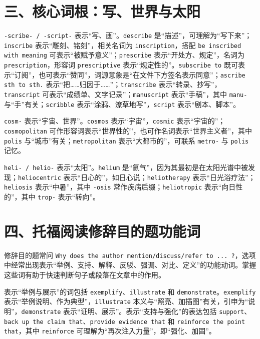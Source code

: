 \documentclass[UTF8,zihao=-4]{ctexart}
\begin{document}
\section*{三、核心词根：写、世界与太阳}

\texttt{-scribe- / -script-} 表示“写、画”。\texttt{describe} 是“描述”，可理解为“写下来”；\texttt{inscribe} 表示“雕刻、铭刻”，相关名词为 \texttt{inscription}，搭配 \texttt{be inscribed with meaning} 可表示“被赋予意义”；\texttt{prescribe} 表示“开处方、规定”，名词为 \texttt{prescription}，形容词 \texttt{prescriptive} 表示“规定性的”。\texttt{subscribe to} 既可表示“订阅”，也可表示“赞同”，词源意象是“在文件下方签名表示同意”；\texttt{ascribe sth to sth.} 表示“把……归因于……”；\texttt{transcribe} 表示“转录、抄写”，\texttt{transcript} 可表示“成绩单、文字记录”；\texttt{manuscript} 表示“手稿”，其中 \texttt{manu-} 与“手”有关；\texttt{scribble} 表示“涂鸦、潦草地写”，\texttt{script} 表示“剧本、脚本”。

\texttt{cosm-} 表示“宇宙、世界”。\texttt{cosmos} 表示“宇宙”，\texttt{cosmic} 表示“宇宙的”；\texttt{cosmopolitan} 可作形容词表示“世界性的”，也可作名词表示“世界主义者”，其中 \texttt{polis} 与“城市”有关；\texttt{metropolitan} 表示“大都市的”，可联系 \texttt{metro-} 与 \texttt{polis} 记忆。

\texttt{heli- / helio-} 表示“太阳”。\texttt{helium} 是“氦气”，因为其最初是在太阳光谱中被发现；\texttt{heliocentric} 表示“日心的”，如日心说；\texttt{heliotherapy} 表示“日光浴疗法”；\texttt{heliosis} 表示“中暑”，其中 \texttt{-osis} 常作疾病后缀；\texttt{heliotropic} 表示“向日性的”，其中 \texttt{trop-} 表示“转向”。

\section*{四、托福阅读修辞目的题功能词}

修辞目的题常问 \texttt{Why does the author mention/discuss/refer to ... ?}，选项中经常出现表示“举例、支持、解释、反驳、强调、对比、定义”的功能动词。掌握这些词有助于快速判断句子或段落在文章中的作用。

表示“举例与展示”的词包括 \texttt{exemplify}、\texttt{illustrate} 和 \texttt{demonstrate}。\texttt{exemplify} 表示“举例说明、作为典型”，\texttt{illustrate} 本义与“照亮、加插图”有关，引申为“说明”，\texttt{demonstrate} 表示“证明、展示”。表示“支持与强化”的表达包括 \texttt{support}、\texttt{back up the claim that}、\texttt{provide evidence that} 和 \texttt{reinforce the point that}，其中 \texttt{reinforce} 可理解为“再次注入力量”，即“强化、加固”。
\end{document}
